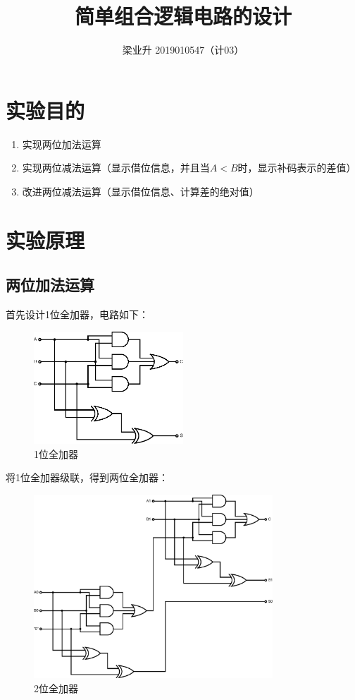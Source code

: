 \documentclass[a4paper]{article}
\begin{document}
\title{简单组合逻辑电路的设计}
\author{梁业升 2019010547（计03）}

\maketitle

\section{实验目的}

\begin{enumerate}
    \item 实现两位加法运算
    \item 实现两位减法运算（显示借位信息，并且当$A<B$时，显示补码表示的差值）
    \item 改进两位减法运算（显示借位信息、计算差的绝对值）
\end{enumerate}

\section{实验原理}

\subsection{两位加法运算}

首先设计1位全加器，电路如下：

\begin{figure}[H]
    \centering
    \includegraphics[width=0.5\textwidth]{./assets/1-bit.eps}
    \caption{1位全加器}
\end{figure}

将1位全加器级联，得到两位全加器：

\begin{figure}[H]
    \centering
    \includegraphics[width=0.8\textwidth]{./assets/2-bit.eps}
    \caption{2位全加器}
\end{figure}
\end{document}
